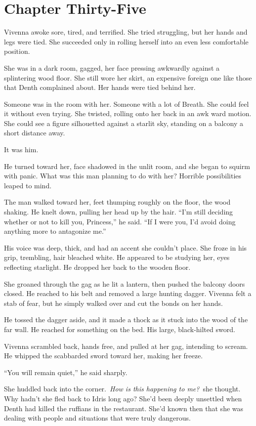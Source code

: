 \section{Chapter Thirty-Five}

Vivenna awoke sore, tired, and terrified. She tried struggling, but her hands and legs were tied. She succeeded only in rolling herself into an even less comfortable position.

She was in a dark room, gagged, her face pressing awkwardly against a splintering wood floor. She still wore her skirt, an expensive foreign one like those that Denth complained about. Her hands were tied behind her.

Someone was in the room with her. Someone with a lot of Breath. She could feel it without even trying. She twisted, rolling onto her back in an awk ward motion. She could see a figure silhouetted against a starlit sky, standing on a balcony a short distance away.

It was him.

He turned toward her, face shadowed in the unlit room, and she began to squirm with panic. What was this man planning to do with her? Horrible possibilities leaped to mind.

The man walked toward her, feet thumping roughly on the floor, the wood shaking. He knelt down, pulling her head up by the hair. “I’m still deciding whether or not to kill you, Princess,” he said. “If I were you, I’d avoid doing anything more to antagonize me.”

His voice was deep, thick, and had an accent she couldn’t place. She froze in his grip, trembling, hair bleached white. He appeared to be studying her, eyes reflecting starlight. He dropped her back to the wooden floor.

She groaned through the gag as he lit a lantern, then pushed the balcony doors closed. He reached to his belt and removed a large hunting dagger. Vivenna felt a stab of fear, but he simply walked over and cut the bonds on her hands.

He tossed the dagger aside, and it made a thock as it stuck into the wood of the far wall. He reached for something on the bed. His large, black-hilted sword.

Vivenna scrambled back, hands free, and pulled at her gag, intending to scream. He whipped the scabbarded sword toward her, making her freeze.

“You will remain quiet,” he said sharply.

She huddled back into the corner.~\textit{How is this happening to me?}~she thought. Why hadn’t she fled back to Idris long ago? She’d been deeply unsettled when Denth had killed the ruffians in the restaurant. She’d known then that she was dealing with people and situations that were truly dangerous.

